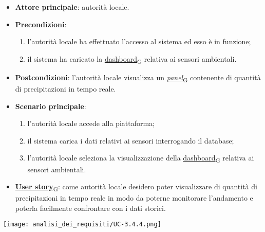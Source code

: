 \begin{itemize}
	\item \textbf{Attore principale}: autorità locale.
	\item \textbf{Precondizioni}:
	      \begin{enumerate}
		      \item l'autorità locale ha effettuato l'accesso al sistema ed esso è in funzione;
		      \item il sistema ha caricato la \href{https://7last.github.io/docs/pb/documentazione-interna/glossario\#dashboard}{dashboard\textsubscript{G}} relativa ai sensori ambientali.
	      \end{enumerate}
	\item \textbf{Postcondizioni}: l'autorità locale visualizza un \href{https://7last.github.io/docs/pb/documentazione-interna/glossario\#panel}{\textit{panel}\textsubscript{G}} contenente di quantità di precipitazioni in tempo reale.
	\item \textbf{Scenario principale}:
	      \begin{enumerate}
		      \item l'autorità locale accede alla piattaforma;
		      \item il sistema carica i dati relativi ai sensori interrogando il database;
		      \item l'autorità locale seleziona la visualizzazione della \href{https://7last.github.io/docs/pb/documentazione-interna/glossario\#dashboard}{dashboard\textsubscript{G}} relativa ai sensori ambientali.
	      \end{enumerate}
	\item \href{https://7last.github.io/docs/pb/documentazione-interna/glossario\#user-story}{\textbf{User story}\textsubscript{G}}:
	      come autorità locale desidero poter visualizzare di quantità di precipitazioni in tempo reale in modo da poterne monitorare l'andamento
	      e poterla facilmente confrontare con i dati storici.
\end{itemize}
\begin{center}
	\texttt{[image: analisi\_dei\_requisiti/UC-3.4.4.png]}
\end{center}


